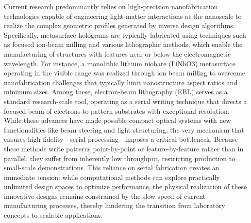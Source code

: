 Current research predominantly relies on high-precision nanofabrication technologies capable of engineering light-matter interactions at the nanoscale to realize the complex geometric profiles generated by inverse design algorithms. Specifically, metasurface holograms are typically fabricated using techniques such as focused ion-beam milling and various lithographic methods, which enable the manufacturing of structures with features near or below the electromagnetic wavelength. For instance, a monolithic lithium niobate (LiNbO3) metasurface operating in the visible range was realized through ion beam milling to overcome nanofabrication challenges that typically limit nanostructure aspect ratios and minimum sizes. \citep{doi_10_1021_acsphotonics_1c00026_bdd15a92} Among these, electron-beam lithography (EBL) serves as a standard research-scale tool, operating as a serial writing technique that directs a focused beam of electrons to pattern substrates with exceptional resolution. \citep{doi_10_1088_1361_6528_ad3c4c_ac8a5241} \citep{doi_10_1021_acsomega_4c01044_0ad8ee05} While these advances have made possible compact optical systems with new functionalities like beam steering and light structuring, the very mechanism that ensures high fidelity---serial processing---imposes a critical bottleneck. Because these methods write patterns point-by-point or feature-by-feature rather than in parallel, they suffer from inherently low throughput, restricting production to small-scale demonstrations. This reliance on serial fabrication creates an immediate tension: while computational methods can explore practically unlimited design spaces to optimize performance, the physical realization of these innovative designs remains constrained by the slow speed of current manufacturing processes, thereby hindering the transition from laboratory concepts to scalable applications. \citep{doi_10_1021_acsphotonics_3c00572_fda8f742} \citep{doi_10_1002_inf2_12116_b5c46838}


